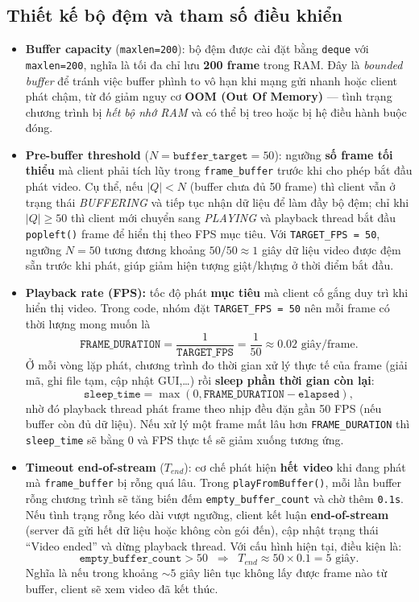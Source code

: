 \subsection{Thiết kế bộ đệm và tham số điều khiển}
\begin{itemize}
    \item \textbf{Buffer capacity} (\texttt{maxlen=200}): bộ đệm được cài đặt bằng \texttt{deque} với \texttt{maxlen=200}, nghĩa là tối đa chỉ lưu \textbf{200 frame} trong RAM. Đây là \textit{bounded buffer} để tránh việc buffer phình to vô hạn khi mạng gửi nhanh hoặc client phát chậm, từ đó giảm nguy cơ \textbf{OOM (Out Of Memory)} — tình trạng chương trình bị \textit{hết bộ nhớ RAM} và có thể bị treo hoặc bị hệ điều hành buộc đóng.
    \item \textbf{Pre-buffer threshold} ($N = \texttt{buffer\_target} = 50$): ngưỡng \textbf{số frame tối thiểu} mà client phải tích lũy trong \texttt{frame\_buffer} trước khi cho phép bắt đầu phát video. Cụ thể, nếu $|Q| < N$ (buffer chưa đủ 50 frame) thì client vẫn ở trạng thái \textit{BUFFERING} và tiếp tục nhận dữ liệu để làm đầy bộ đệm; chỉ khi $|Q|\ge 50$ thì client mới chuyển sang \textit{PLAYING} và playback thread bắt đầu \texttt{popleft()} frame để hiển thị theo FPS mục tiêu. Với \texttt{TARGET\_FPS = 50}, ngưỡng $N=50$ tương đương khoảng $50/50 \approx 1$ giây dữ liệu video được đệm sẵn trước khi phát, giúp giảm hiện tượng giật/khựng ở thời điểm bắt đầu.
    \item \textbf{Playback rate (FPS):} tốc độ phát \textbf{mục tiêu} mà client cố gắng duy trì khi hiển thị video. Trong code, nhóm đặt \texttt{TARGET\_FPS = 50} nên mỗi frame có thời lượng mong muốn là
    \[\texttt{FRAME\_DURATION} = \frac{1}{\texttt{TARGET\_FPS}} = \frac{1}{50} \approx 0.02 \text{ giây/frame}.\]Ở mỗi vòng lặp phát, chương trình đo thời gian xử lý thực tế của frame (giải mã, ghi file tạm, cập nhật GUI,\ldots) rồi \textbf{sleep phần thời gian còn lại}:\[\texttt{sleep\_time} = \max(0, \texttt{FRAME\_DURATION} - \texttt{elapsed}),\]nhờ đó playback thread phát frame theo nhịp đều đặn gần 50 FPS (nếu buffer còn đủ dữ liệu). Nếu xử lý một frame mất lâu hơn \texttt{FRAME\_DURATION} thì \texttt{sleep\_time} sẽ bằng 0 và FPS thực tế sẽ giảm xuống tương ứng.
    \item \textbf{Timeout end-of-stream} ($T_{end}$): cơ chế phát hiện \textbf{hết video} khi đang phát mà \texttt{frame\_buffer} bị rỗng quá lâu. Trong \texttt{playFromBuffer()}, mỗi lần buffer rỗng chương trình sẽ tăng biến đếm \texttt{empty\_buffer\_count} và chờ thêm \texttt{0.1s}. Nếu tình trạng rỗng kéo dài vượt ngưỡng, client kết luận \textbf{end-of-stream} (server đã gửi hết dữ liệu hoặc không còn gói đến), cập nhật trạng thái ``Video ended'' và dừng playback thread.
    Với cấu hình hiện tại, điều kiện là:
    \[
    \texttt{empty\_buffer\_count} > 50 \;\;\Rightarrow\;\; T_{end} \approx 50 \times 0.1 = 5 \text{ giây}.
    \]
    Nghĩa là nếu trong khoảng $\sim 5$ giây liên tục không lấy được frame nào từ buffer, client sẽ xem video đã kết thúc.

\end{itemize}

